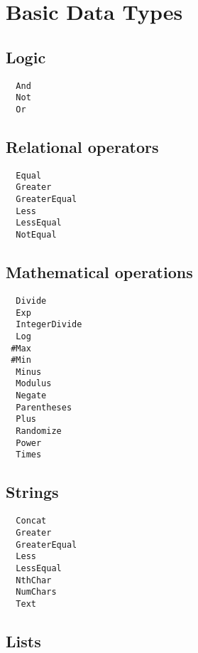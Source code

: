 \section{Basic Data Types}

\subsection{Logic}

\begin{multicols}{3}
\begin{verbatim}
  And 
  Not 
  Or 
\end{verbatim}
\end{multicols}

\subsection{Relational operators}

\begin{multicols}{3}
\begin{verbatim}
  Equal 
  Greater 
  GreaterEqual 
  Less 
  LessEqual 
  NotEqual 
\end{verbatim}
\end{multicols}

\subsection{Mathematical operations}

\begin{multicols}{3}
\begin{verbatim}
  Divide 
  Exp 
  IntegerDivide 
  Log 
 #Max
 #Min
  Minus 
  Modulus 
  Negate 
  Parentheses 
  Plus 
  Randomize 
  Power 
  Times 
\end{verbatim}
\end{multicols}


\subsection{Strings}

\begin{multicols}{3}
\begin{verbatim}
  Concat
  Greater
  GreaterEqual
  Less
  LessEqual
  NthChar 
  NumChars 
  Text
\end{verbatim}
\end{multicols}

\subsection{Lists}

